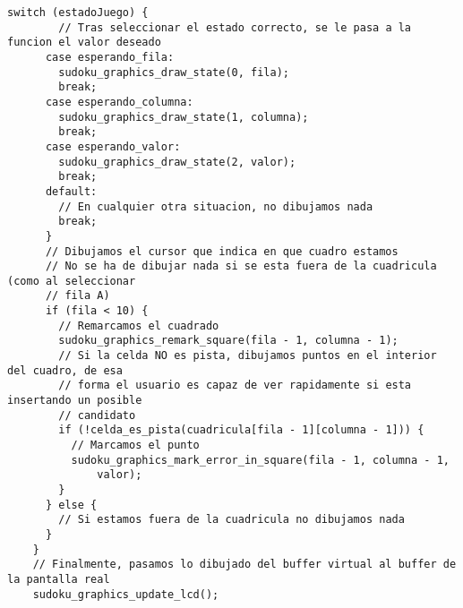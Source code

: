\documentclass[12pt,letterpaper]{article}
\begin{document}
{\begin{lstlisting}[frame=single]
      switch (estadoJuego) {
        // Tras seleccionar el estado correcto, se le pasa a la funcion el valor deseado
      case esperando_fila:
        sudoku_graphics_draw_state(0, fila);
        break;
      case esperando_columna:
        sudoku_graphics_draw_state(1, columna);
        break;
      case esperando_valor:
        sudoku_graphics_draw_state(2, valor);
        break;
      default:
        // En cualquier otra situacion, no dibujamos nada
        break;
      }
      // Dibujamos el cursor que indica en que cuadro estamos
      // No se ha de dibujar nada si se esta fuera de la cuadricula (como al seleccionar 
      // fila A)
      if (fila < 10) {
        // Remarcamos el cuadrado
        sudoku_graphics_remark_square(fila - 1, columna - 1);
        // Si la celda NO es pista, dibujamos puntos en el interior del cuadro, de esa 
        // forma el usuario es capaz de ver rapidamente si esta insertando un posible
        // candidato
        if (!celda_es_pista(cuadricula[fila - 1][columna - 1])) {
          // Marcamos el punto
          sudoku_graphics_mark_error_in_square(fila - 1, columna - 1,
              valor);
        }
      } else {
        // Si estamos fuera de la cuadricula no dibujamos nada
      }
    }
    // Finalmente, pasamos lo dibujado del buffer virtual al buffer de la pantalla real
    sudoku_graphics_update_lcd();


\end{lstlisting}}
\end{document}
